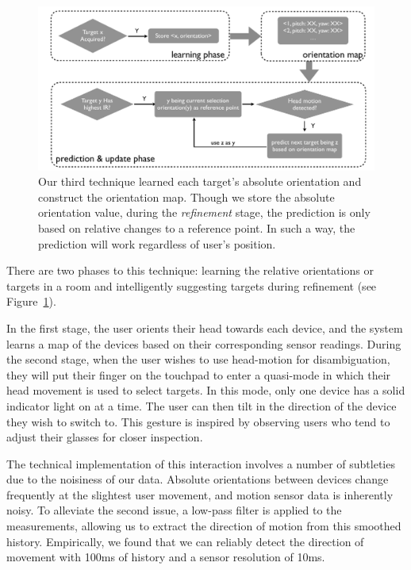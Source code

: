 \begin{figure}[t]
\centering
\includegraphics[width=1\columnwidth]{figures/third_technique3.pdf}
\caption{ Our third technique learned each target's absolute orientation and construct the orientation map. Though we store the absolute orientation value, during the {\em refinement} stage, the prediction is only based on relative changes to a reference point. In such a way, the prediction will work regardless of user's position.}
\label{fig:third_technique}
\end{figure}

There are two phases to this technique: learning the relative orientations or targets in a room and intelligently suggesting targets during refinement (see Figure~\ref{fig:third_technique}).

In the first stage, the user orients their head towards each device, and the system learns a map of the devices based on their corresponding sensor readings. During the second stage, when the user wishes to use head-motion for disambiguation, they will put their finger on the touchpad to enter a quasi-mode in which their head movement is used to select targets. In this mode, only one device has a solid indicator light on at a time.   The user can then tilt in the direction of the device they wish to switch to. This gesture is inspired by observing users who tend to adjust their glasses for closer inspection.

The technical implementation of this interaction involves a number of subtleties due to the noisiness of our data. Absolute orientations between devices change frequently at the slightest user movement, and motion sensor data is inherently noisy. To alleviate the second issue, a low-pass filter is applied to the measurements, allowing us to extract the direction of motion from this smoothed history. Empirically, we found that we can reliably detect the direction of movement with 100ms of history and a sensor resolution of 10ms.

